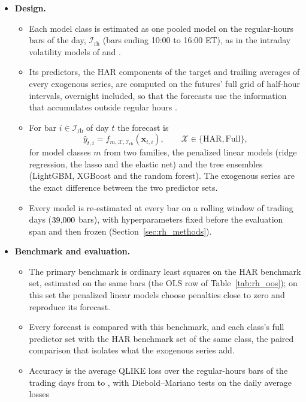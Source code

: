 \begin{itemize}
\begin{itemize}
  \end{itemize}
\item \textbf{Design.}
  \begin{itemize}
  \item Each model class is estimated as one pooled model on the \rhePoolNBars{} regular-hours bars of the day,
    $\mathcal I_{\mathrm{rh}}$ (bars ending 10:00 to 16:00 ET), as in the intraday volatility models of
    \citet{EngleSokalska2012} and \citet{ZhangZhangCucuringuQian2024}.
  \item Its predictors, the HAR components of the target and trailing averages of every exogenous series, are
    computed on the futures' full grid of \rhdmNIntervals{} half-hour intervals, overnight included, so that the
    forecasts use the information that accumulates outside regular hours \citep{StroudJohannes2014}.
  \item For bar $i \in \mathcal I_{\mathrm{rh}}$ of day $t$ the forecast is
    \[
      \hat y_{t,i} = f_{m,\mathcal X,\mathcal I_{\mathrm{rh}}}(\bm x_{t,i}), \qquad
      \mathcal X \in \{\mathrm{HAR}, \mathrm{Full}\},
    \]
    for model classes $m$ from two families, the penalized linear models (ridge regression, the lasso and the
    elastic net) and the tree ensembles (LightGBM, XGBoost and the random forest). The exogenous series are the exact
    difference between the two predictor sets.
  \item Every model is re-estimated at every bar on a rolling window of \rhorWindowDays{} trading days
    ($39{,}000$ bars), with hyperparameters fixed before the evaluation span and then frozen
    (Section~\ref{sec:rh_methods}).
  \end{itemize}
\item \textbf{Benchmark and evaluation.}
  \begin{itemize}
  \item The primary benchmark is ordinary least squares on the HAR benchmark set, estimated on the same bars (the OLS
    row of Table~\ref{tab:rh_oos}); on this set the penalized linear models choose penalties close to zero and
    reproduce its forecast.
  \item Every forecast is compared with this benchmark, and each class's full predictor set with the HAR benchmark
    set of the same class, the paired comparison that isolates what the exogenous series add.
  \item Accuracy is the average QLIKE loss over the \rhorNIntB{} regular-hours bars of the \rhorDays{} trading days
    from \rhorSpanStart{} to \rhorSpanEnd, with Diebold--Mariano tests on the daily average losses

\end{itemize}
\end{itemize}
